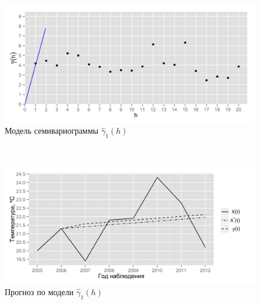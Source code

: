 \documentclass{beamer}
\begin{document}
\begin{frame}
\begin{multicols}{2}
    \columnbreak
    \begin{figure}[H]
      \begin{center}
        \begin{minipage}[H]{0.95\linewidth}
          \begin{center}
            \includegraphics[width=1\linewidth]{../../figures/variogram/lin-modeled.png} \\ Модель семивариограммы $\widehat{\gamma}_1(h)$
          \end{center}
        \end{minipage}
        \\
        \begin{minipage}[H]{0.95\linewidth}
          \begin{center}
            \includegraphics[width=1\linewidth]{../../figures/variogram/lin-cross-prediction.png} \\ Прогноз по модели $\widehat{\gamma}_1(h)$
          \end{center}
        \end{minipage}
      \end{center}
    \end{figure}
  \end{multicols}
\end{frame}
\end{document}
